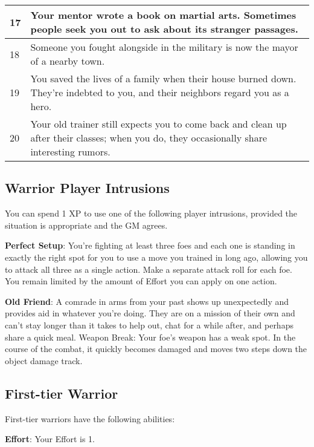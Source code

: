 \begin{multicols}{2}
\begin{table*}
\begin{tabularx}{\textwidth}{| p{} | p{} |}
17 & Your mentor wrote a book on martial arts. Sometimes people seek you out to ask about its stranger passages. \\ \hline
18 & Someone you fought alongside in the military is now the mayor of a nearby town. \\ \hline
19 & You saved the lives of a family when their house burned down. They’re indebted to you, and their neighbors regard you as a hero. \\ \hline
20 & Your old trainer still expects you to come back and clean up after their classes; when you do, they occasionally share interesting rumors. \\ \hline

\end{tabularx}

\end{table*}

\subsection{Warrior Player Intrusions}

You can spend 1 XP to use one of the following player intrusions, provided the situation is appropriate and the GM agrees.

\textbf{Perfect Setup}: You’re fighting at least three foes and each one is standing in exactly the right spot for you to use a move you trained in long ago, allowing you to attack all three as a single action. Make a separate attack roll for each foe. You remain limited by the amount of Effort you can apply on one action.

\textbf{Old Friend}: A comrade in arms from your past shows up unexpectedly and provides aid in whatever you’re doing. They are on a mission of their own and can’t stay longer than it takes to help out, chat for a while after, and perhaps share a quick meal.
Weapon Break: Your foe’s weapon has a weak spot. In the course of the combat, it quickly becomes damaged and moves two steps down the object damage track.

\subsection{First-tier Warrior}

First-tier warriors have the following abilities:

\textbf{Effort}: Your Effort is 1.


\end{multicols}
